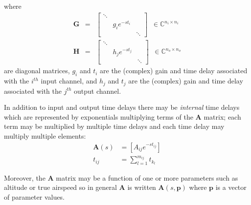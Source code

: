 \documentclass[11pt,openany,twoside]{book}
\numberwithin{equation}{section}		%
\newcommand{\Newterm}[1]{{\em #1}}
\newcommand{\Matrix}[1]{\boldsymbol{#1}}
\newcommand{\Vector}[1]{\boldsymbol{#1}}
\begin{document}
where
\begin{eqnarray}
\Matrix{G} &=& \left[ \begin{array}{ccc}
\ddots &           &        \\
       & g_i e^{-st_i} &        \\
       &           & \ddots
\end{array}
\right] \;\; \in \mathbb{C}^{n_i \times n_i}	\nonumber	\\
\Matrix{H} &=& \left[ \begin{array}{ccc}
\ddots &           &        \\
       & h_j e^{-st_j} &        \\
       &           & \ddots
\end{array}
\right]	\;\; \in \mathbb{C}^{n_o \times n_o}	\nonumber
\end{eqnarray}
are diagonal matrices, $g_i$ and $t_i$ are the (complex) gain
and time delay associated with the $i^{th}$ input channel, and
$h_j$ and $t_j$ are the (complex) gain and time delay associated with
the $j^{th}$ output channel.

In addition to input and output time delays there may be
\Newterm{internal} time delays which are represented by exponentials
multiplying terms of the $\Matrix{A}$ matrix; each term may be
multiplied by multiple time delays and each time delay may multiply
multiple elements:
\begin{equation}
\begin{split}
\Matrix{A}(s) &= \left[ A_{ij} e^{-st_{ij}} \right] \\
t_{ij} &= \sum_{l=1}^{m_{ij}} t_{k_l}
\end{split}		\nonumber
\end{equation}

Moreover, the $\Matrix{A}$ matrix may be a function of one or more parameters
such as altitude or true airspeed so in general $\Matrix{A}$ is written
$\Matrix{A}(s,\Vector{p})$ where $\Vector{p}$ is a vector of parameter values.
\end{document}
